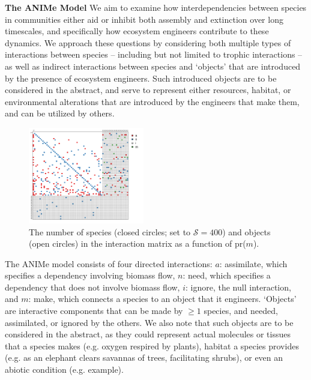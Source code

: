 \documentclass[twocolumn,preprintnumbers,amsmath,amssymb,superscriptaddress]{revtex4}
\begin{document}
\textbf{The ANIMe Model} We aim to examine how interdependencies between species in communities either aid or inhibit both assembly and extinction over long timescales, and specifically how ecosystem engineers contribute to these dynamics.
We approach these questions by considering both multiple types of interactions between species -- including but not limited to trophic interactions --  as well as indirect interactions between species and `objects' that are introduced by the presence of ecosystem engineers.
Such introduced objects are to be considered in the abstract, and serve to represent either resources, habitat, or environmental alterations that are introduced by the engineers that make them, and can be utilized by others. 


\begin{figure}
\centering
\includegraphics[width=0.45\textwidth]{matrix.pdf}
\caption{
The number of species (closed circles; set to $\mathcal S=400$) and objects (open circles) in the interaction matrix as a function of pr($m$).
}
\label{fig:matrix}
\end{figure} 


The ANIMe model consists of four directed interactions:
$a$: assimilate, which specifies a dependency involving biomass flow,
$n$: need, which specifies a dependency that does not involve biomass flow,
$i$: ignore, the null interaction, and
$m$: make, which connects a species to an object that it engineers. 
`Objects' are interactive components that can be made by $\geq 1$ species, and needed, assimilated, or ignored by the others.
We also note that such objects are to be considered in the abstract, as they could represent actual molecules or tissues that a species makes (e.g. oxygen respired by plants), habitat a species provides (e.g. as an elephant clears savannas of trees, facilitating shrubs), or even an abiotic condition (e.g. example). 
\end{document}
